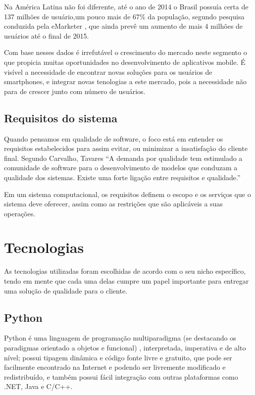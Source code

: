 \documentclass[
	article,			%
	11pt,				%
	oneside,			%
	a4paper,			%
	english,			%
	brazil,				%
	sumario=tradicional
	]{abntex2}
\begin{document}
Na América Latina não foi diferente, até o ano de 2014 o Brasil possuía certa de 137 milhões de usuário,um pouco mais de 67\% da população, segundo pesquisa conduzida pela eMarketer \cite{emarketer}, que ainda prevê um aumento de mais 4 milhões de usuários até o final de 2015.

Com base nesses dados é irrefutável o crescimento do mercado neste segmento o que propicia muitas oportunidades no desenvolvimento de aplicativos mobile.
É visível a necessidade de encontrar novas soluções para os usuários de smartphones, e integrar novas tenologias a este mercado, pois a necessidade não para de crescer junto com número de usuários.

\subsection{Requisitos do sistema}

Quando pensamos em qualidade de software, o foco está em entender os requisitos estabelecidos para assim evitar, ou minimizar a insatisfação do cliente final.
Segundo Carvalho, Tavares “A demanda por qualidade tem estimulado a comunidade de software para o desenvolvimento de modelos que conduzam a qualidade dos sistemas. Existe uma forte ligação entre requisitos e qualidade.” \cite{tematec}

Em um sistema computacional, os requisitos definem o escopo e os serviços que o sistema deve oferecer, assim como as restrições que são aplicáveis a suas operações.

\section{Tecnologias}

As tecnologias utilizadas foram escolhidas de acordo com o seu nicho específico, tendo em mente que cada uma delas cumpre um papel importante para entregar uma solução de qualidade para o cliente.

\subsection{Python}

Python é uma linguagem de programação multiparadigma (se destacando os paradigmas orientado a objetos e funcional) , interpretada, imperativa e de alto nível; possui tipagem dinâmica e código fonte livre \cite{pythonlicense} e gratuito, que pode ser facilmente encontrado na Internet e podendo ser livremente modificado e redistribuído, e também possui fácil integração com outras plataformas como .NET, Java e C/C++.
\end{document}
